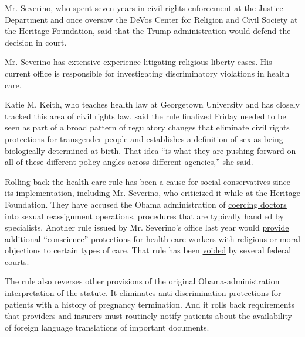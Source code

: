 Mr. Severino, who spent seven years in civil-rights enforcement at the
Justice Department and once oversaw the DeVos Center for Religion and
Civil Society at the Heritage Foundation, said that the Trump
administration would defend the decision in court.

Mr. Severino has
\href{https://www.theatlantic.com/politics/archive/2017/06/the-man-behind-trumps-religious-freedom-agenda-for-health-care/528912/}{extensive
experience} litigating religious liberty cases. His current office is
responsible for investigating discriminatory violations in health care.

Katie M. Keith, who teaches health law at Georgetown University and has
closely tracked this area of civil rights law, said the rule finalized
Friday needed to be seen as part of a broad pattern of regulatory
changes that eliminate civil rights protections for transgender people
and establishes a definition of sex as being biologically determined at
birth. That idea ``is what they are pushing forward on all of these
different policy angles across different agencies,'' she said.

Rolling back the health care rule has been a cause for social
conservatives since its implementation, including Mr. Severino, who
\href{https://www.heritage.org/health-care-reform/report/proposed-obamacare-gender-identity-mandate-threatens-freedom-conscience}{criticized
it} while at the Heritage Foundation. They have accused the Obama
administration of
\href{https://www.washingtonpost.com/outlook/2019/05/29/this-is-cruelest-thing-trump-administration-has-done-trans-people-yet/}{coercing
doctors} into sexual reassignment operations, procedures that are
typically handled by specialists. Another rule issued by Mr. Severino's
office last year would
\href{https://www.nytimes3xbfgragh.onion/2019/05/02/upshot/conscience-rule-trump-religious-exemption-health-care.html}{provide
additional ``conscience'' protections} for health care workers with
religious or moral objections to certain types of care. That rule has
been
\href{https://www.nytimes3xbfgragh.onion/2019/11/06/upshot/trump-conscience-rule-overturned.html}{voided}
by several federal courts.

The rule also reverses other provisions of the original
Obama-administration interpretation of the statute. It eliminates
anti-discrimination protections for patients with a history of pregnancy
termination. And it rolls back requirements that providers and insurers
must routinely notify patients about the availability of foreign
language translations of important documents.

